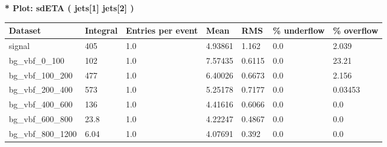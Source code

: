 \documentclass[a4paper, 10pt]{article}
\begin{document}
\textbf{* Plot: sdETA ( jets[1] jets[2] ) }\\
   \begin{table}[H]
  \begin{center}
    \begin{tabular}{|m{23.0mm}|m{23.0mm}|m{18.0mm}|m{19.0mm}|m{19.0mm}|m{19.0mm}|m{19.0mm}|}
      \hline
      {\cellcolor{yellow}         Dataset}& {\cellcolor{yellow}         Integral}& {\cellcolor{yellow}         Entries per event}& {\cellcolor{yellow}         Mean}& {\cellcolor{yellow}         RMS}& {\cellcolor{yellow}         \% underflow}& {\cellcolor{yellow}         \% overflow}\\
      \hline
      {\cellcolor{white}         signal}& {\cellcolor{white}         405}& {\cellcolor{white}         1.0}& {\cellcolor{white}         4.93861}& {\cellcolor{white}         1.162}& {\cellcolor{green}         0.0}& {\cellcolor{green}         2.039}\\
      \hline
      {\cellcolor{white}         bg\_vbf\_0\_100}& {\cellcolor{white}         102}& {\cellcolor{white}         1.0}& {\cellcolor{white}         7.57435}& {\cellcolor{white}         0.6115}& {\cellcolor{red}         0.0}& {\cellcolor{red}         23.21}\\
      \hline
      {\cellcolor{white}         bg\_vbf\_100\_200}& {\cellcolor{white}         477}& {\cellcolor{white}         1.0}& {\cellcolor{white}         6.40026}& {\cellcolor{white}         0.6673}& {\cellcolor{green}         0.0}& {\cellcolor{green}         2.156}\\
      \hline
      {\cellcolor{white}         bg\_vbf\_200\_400}& {\cellcolor{white}         573}& {\cellcolor{white}         1.0}& {\cellcolor{white}         5.25178}& {\cellcolor{white}         0.7177}& {\cellcolor{green}         0.0}& {\cellcolor{green}         0.03453}\\
      \hline
      {\cellcolor{white}         bg\_vbf\_400\_600}& {\cellcolor{white}         136}& {\cellcolor{white}         1.0}& {\cellcolor{white}         4.41616}& {\cellcolor{white}         0.6066}& {\cellcolor{green}         0.0}& {\cellcolor{green}         0.0}\\
      \hline
      {\cellcolor{white}         bg\_vbf\_600\_800}& {\cellcolor{white}         23.8}& {\cellcolor{white}         1.0}& {\cellcolor{white}         4.22247}& {\cellcolor{white}         0.4867}& {\cellcolor{green}         0.0}& {\cellcolor{green}         0.0}\\
      \hline
      {\cellcolor{white}         bg\_vbf\_800\_1200}& {\cellcolor{white}         6.04}& {\cellcolor{white}         1.0}& {\cellcolor{white}         4.07691}& {\cellcolor{white}         0.392}& {\cellcolor{green}         0.0}& {\cellcolor{green}         0.0}\\

\end{tabular}
\end{center}
\end{table}
\end{document}
